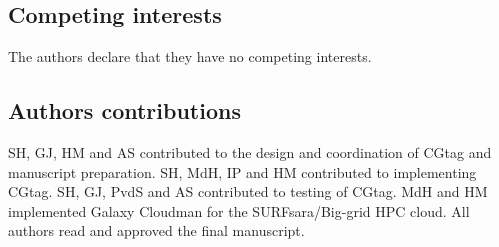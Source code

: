 \subsection*{Competing interests}

The authors declare that they have no competing interests.


\subsection*{Authors contributions}

SH, GJ, HM and AS contributed to the design and coordination of CGtag and manuscript preparation. SH, MdH, IP and HM contributed to implementing CGtag.  SH, GJ, PvdS and AS contributed to testing of CGtag. MdH and HM implemented Galaxy Cloudman for the SURFsara/Big-grid HPC cloud. All authors read and approved the final manuscript.

\footnotesize


\normalsize
